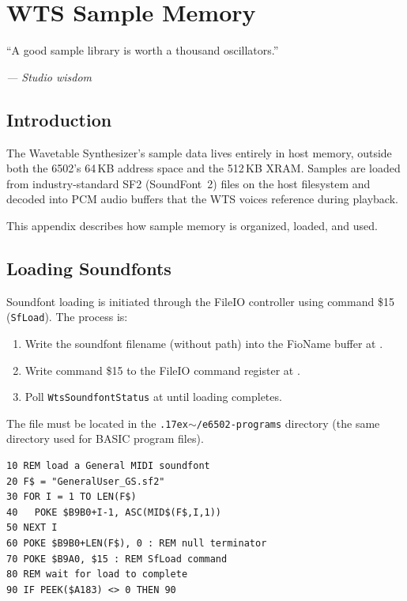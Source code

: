 \chapter{WTS Sample Memory}

\epigraph{``A good sample library is worth a thousand oscillators.''}%
{\textit{--- Studio wisdom}}

\section*{Introduction}

The Wavetable Synthesizer's sample data lives entirely in host memory, outside
both the 6502's 64\,KB address space and the 512\,KB XRAM.  Samples are loaded
from industry-standard SF2 (SoundFont~2) files on the host filesystem and
decoded into PCM audio buffers that the WTS voices reference during playback.

This appendix describes how sample memory is organized, loaded, and used.


\section{Loading Soundfonts}
\label{sec:wts-loading}

Soundfont loading is initiated through the FileIO controller using command \$15
(\texttt{SfLoad}).  The process is:

\begin{enumerate}
  \item Write the soundfont filename (without path) into the FioName buffer at
        .
  \item Write command \$15 to the FileIO command register at .
  \item Poll \texttt{WtsSoundfontStatus} at  until loading completes.
\end{enumerate}

The file must be located in the \texttt{{\raise.17ex\hbox{$\scriptstyle\sim$}}/e6502-programs}
directory (the same directory used for BASIC program files).

\begin{lstlisting}
10 REM load a General MIDI soundfont
20 F$ = "GeneralUser_GS.sf2"
30 FOR I = 1 TO LEN(F$)
40   POKE $B9B0+I-1, ASC(MID$(F$,I,1))
50 NEXT I
60 POKE $B9B0+LEN(F$), 0 : REM null terminator
70 POKE $B9A0, $15 : REM SfLoad command
80 REM wait for load to complete
90 IF PEEK($A183) <> 0 THEN 90
\end{lstlisting}

